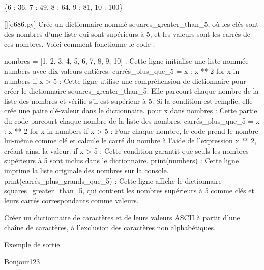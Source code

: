 \{6 : 36, 7 : 49, 8 : 64, 9 : 81, 10 : 100\}
        \par
        \begin{solution}
            \renewcommand{\nomfichier}{q686.py}
            \pythonfile{\chemincode \nomfichier}[][\nomfichier]
            Crée un dictionnaire nommé squares_greater_than_5, où les clés sont des nombres d'une liste qui sont supérieurs à 5, et les valeurs sont les carrés de ces nombres. Voici comment fonctionne le code :

    nombres = [1, 2, 3, 4, 5, 6, 7, 8, 9, 10] : Cette ligne initialise une liste nommée numbers avec dix valeurs entières.
    carrés_plus_que_5 = {x : x ** 2 for x in numbers if x > 5} : Cette ligne utilise une compréhension de dictionnaire pour créer le dictionnaire squares_greater_than_5. Elle parcourt chaque nombre de la liste des nombres et vérifie s'il est supérieur à 5. Si la condition est remplie, elle crée une paire clé-valeur dans le dictionnaire.
        pour x dans nombres : Cette partie du code parcourt chaque nombre de la liste des nombres.
        carrés_plus_que_5 = {x : x ** 2 for x in numbers if x > 5} : Pour chaque nombre, le code prend le nombre lui-même comme clé et calcule le carré du nombre à l'aide de l'expression x ** 2, créant ainsi la valeur.
        if x > 5 : Cette condition garantit que seuls les nombres supérieurs à 5 sont inclus dans le dictionnaire.
    print(numbers) : Cette ligne imprime la liste originale des nombres sur la console.
    print(carrés_plus_grands_que_5) : Cette ligne affiche le dictionnaire squares_greater_than_5, qui contient les nombres supérieurs à 5 comme clés et leurs carrés correspondants comme valeurs.
        \end{solution}
        

        \question
        Créer un dictionnaire de caractères et de leurs valeurs ASCII à partir d'une chaîne de caractères, à l'exclusion des caractères non alphabétiques.

Exemple de sortie

Bonjour123


